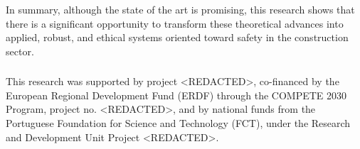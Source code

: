 \documentclass[runningheads]{llncs}
\begin{document}
In summary, although the state of the art is promising, this research shows that there is a significant opportunity to transform these theoretical advances into applied, robust, and ethical systems oriented toward safety in the construction sector.

\begin{credits}
\subsubsection{\ackname}
This research was supported by project <REDACTED>, co-financed by the European Regional Development Fund (ERDF) through the COMPETE 2030 Program, project no. <REDACTED>, and by national funds from the Portuguese Foundation for Science and Technology (FCT), under the Research and Development Unit Project <REDACTED>.
\end{credits}

%


%
%
%
%
%
\begingroup


\endgroup

%
\end{document}
